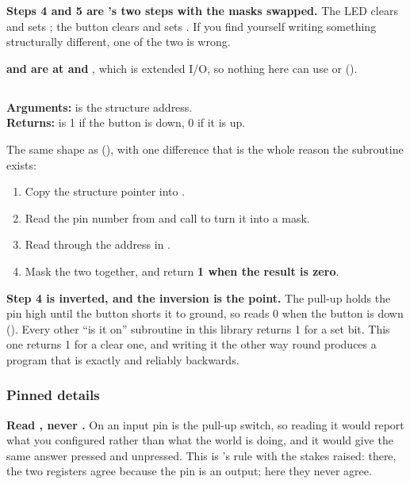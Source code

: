 \textbf{Steps 4 and 5 are 's two steps with the masks swapped.} The LED clears
 and sets ; the button clears  and sets . If you find
yourself writing something structurally different, one of the two is wrong.

\textbf{ and  are at  and }, which is extended I/O,
so nothing here can use  or  ().

\subsection{}
\label{c3:sec:pressed}
\noindent\textbf{Arguments:}  is the structure address.\\
\textbf{Returns:}  is 1 if the button is down, 0 if it is up.

\medskip
\noindent The same shape as  (), with one difference that
is the whole reason the subroutine exists:
\begin{enumerate}
  \item Copy the structure pointer into .
  \item Read the pin number from  and call  to turn it into a mask.
  \item Read  through the address in .
  \item Mask the two together, and return \textbf{1 when the result is zero}.
\end{enumerate}

\textbf{Step 4 is inverted, and the inversion is the point.} The pull-up holds the pin high until
the button shorts it to ground, so  reads 0 when the button is down
(). Every other ``is it on'' subroutine in this library returns 1 for a set
bit. This one returns 1 for a clear one, and writing it the other way round produces a program that
is exactly and reliably backwards.

\subsubsection{Pinned details}
\textbf{Read , never .} On an input pin  is the pull-up switch,
so reading it would report what you configured rather than what the world is doing, and it would
give the same answer pressed and unpressed. This is 's rule with the stakes
raised: there, the two registers agree because the pin is an output; here they never agree.

